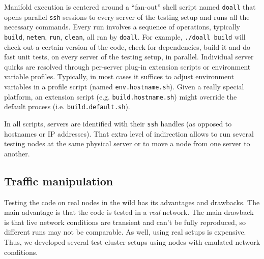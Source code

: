 \documentclass[conference]{IEEEtran}
\begin{document}
Manifold execution is centered around a ``fan-out'' shell script named {\tt doall} that opens parallel {\tt ssh} sessions to every server of the testing setup and runs all the necessary commands.
Every run involves a sequence of operations, typically {\tt build}, {\tt netem}, {\tt run}, {\tt clean}, all ran by {\tt doall}. For example, {\tt ./doall build} will check out a certain version of the code, check for dependencies, build it and do fast unit tests, on every server of the testing setup, in parallel.
Individual server quirks are resolved through per-server plug-in extension scripts or environment variable profiles. Typically, in most cases it suffices to adjust environment variables in a profile script (named {\tt env.hostname.sh}). Given a really special platform, an extension script (e.g. {\tt build.hostname.sh}) might override the default process (i.e. {\tt build.default.sh}).

In all scripts, servers are identified with their {\tt ssh} handles (as opposed to hostnames or IP addresses). That extra level of indirection allows to run several testing nodes at the same physical server or to move a node from one  server to another.


\subsection{Traffic manipulation}

Testing the code on real nodes in the wild has its advantages and drawbacks. The main advantage is that the code is tested in a \emph{real} network. The main drawback is that live network conditions are transient and can't be fully reproduced, so different runs may not be comparable. As well, using real setups is expensive. Thus, we developed several test cluster setups using nodes with emulated network conditions.

\end{document}
